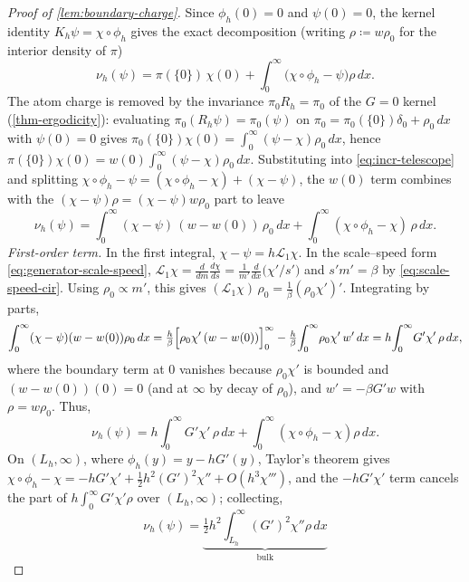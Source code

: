 \documentclass[aap,preprint]{imsart}
\numberwithin{equation}{section}
\theoremstyle{plain}
\theoremstyle{definition}
\begin{document}
\begin{proof}[Proof of \cref{lem:boundary-charge}]
Since $\phi_h(0)=0$ and $\psi(0)=0$, the kernel identity $K_h\psi=\chi\circ\phi_h$ gives the exact decomposition (writing $\rho\coloneqq w\rho_0$ for the interior density of $\pi$)
\begin{equation}\label{eq:incr-telescope}
  \nu_h(\psi)=\pi(\{0\})\,\chi(0)+\int_0^\infty\bigl(\chi\circ\phi_h-\psi\bigr)\rho\,dx .
\end{equation}
The atom charge is removed by the invariance $\pi_0R_h=\pi_0$ of the $G=0$ kernel (\cref{thm-ergodicity}): evaluating $\pi_0(R_h\psi)=\pi_0(\psi)$ on $\pi_0=\pi_0(\{0\})\delta_0+\rho_0\,dx$ with $\psi(0)=0$ gives $\pi_0(\{0\})\chi(0)=\int_0^\infty(\psi-\chi)\rho_0\,dx$, hence $\pi(\{0\})\chi(0)=w(0)\int_0^\infty(\psi-\chi)\rho_0\,dx$.  Substituting into \eqref{eq:incr-telescope} and splitting $\chi\circ\phi_h-\psi=(\chi\circ\phi_h-\chi)+(\chi-\psi)$, the $w(0)$ term combines with the $(\chi-\psi)\rho=(\chi-\psi)w\rho_0$ part to leave
\begin{equation}\label{eq:key-defect}
  \nu_h(\psi)=\int_0^\infty(\chi-\psi)\,(w-w(0))\,\rho_0\,dx
    +\int_0^\infty(\chi\circ\phi_h-\chi)\,\rho\,dx .
\end{equation}
\emph{First-order term.}  In the first integral, $\chi-\psi=h\mathcal{L}_1\chi$. In the scale--speed form \eqref{eq:generator-scale-speed}, $\mathcal{L}_1\chi=\frac{d}{dm}\frac{d\chi}{ds}=\frac{1}{m'}\frac{d}{dx}\bigl(\chi'/s'\bigr)$ and $s'm'=\beta$ by \eqref{eq:scale-speed-cir}. Using $\rho_0\propto m'$, this gives $(\mathcal{L}_1\chi)\,\rho_0=\tfrac1\beta(\rho_0\chi')'$.  Integrating by parts,
\[
  \int_0^\infty(\chi-\psi)(w-w(0))\rho_0\,dx
   =\tfrac{h}{\beta}\Bigl[\rho_0\chi'\,(w-w(0))\Bigr]_0^\infty
    -\tfrac{h}{\beta}\!\int_0^\infty\!\rho_0\chi'\,w'\,dx
   =h\!\int_0^\infty\! G'\chi'\,\rho\,dx ,
\]
where the boundary term at $0$ vanishes because $\rho_0\chi'$ is bounded and $(w-w(0))(0)=0$ (and at $\infty$ by decay of $\rho_0$), and $w'=-\beta G'w$ with $\rho=w\rho_0$.  Thus,
\begin{equation}\label{eq:nu-residual}
  \nu_h(\psi)=h\!\int_0^\infty\! G'\chi'\,\rho\,dx+\int_0^\infty(\chi\circ\phi_h-\chi)\rho\,dx .
\end{equation}
On $(L_h,\infty)$, where $\phi_h(y)=y-hG'(y)$, Taylor's theorem gives $\chi\circ\phi_h-\chi=-hG'\chi'+\tfrac12h^2(G')^2\chi''+O(h^3\chi''')$, and the $-hG'\chi'$ term cancels the part of $h\int_0^\infty G'\chi'\rho$ over $(L_h,\infty)$; collecting,
\begin{equation}\label{eq:nu-three}
  \nu_h(\psi)=\underbrace{\tfrac12h^2\!\int_{L_h}^\infty\!(G')^2\chi''\rho\,dx}_{\text{bulk}}

\end{equation}
\end{proof}
\end{document}
